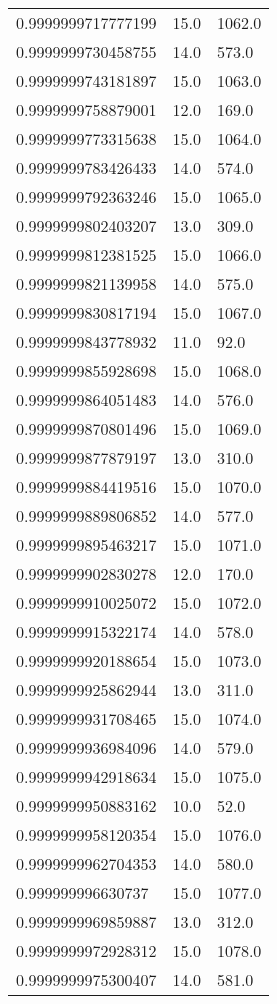 \begin{center}
\begin{supertabular}[H]{p{0.30\textwidth}p{0.05\textwidth}p{0.05\textwidth}}
0.9999999717777199 & 15.0 & 1062.0 \\ 
0.9999999730458755 & 14.0 & 573.0 \\ 
0.9999999743181897 & 15.0 & 1063.0 \\ 
0.9999999758879001 & 12.0 & 169.0 \\ 
0.9999999773315638 & 15.0 & 1064.0 \\ 
0.9999999783426433 & 14.0 & 574.0 \\ 
0.9999999792363246 & 15.0 & 1065.0 \\ 
0.9999999802403207 & 13.0 & 309.0 \\ 
0.9999999812381525 & 15.0 & 1066.0 \\ 
0.9999999821139958 & 14.0 & 575.0 \\ 
0.9999999830817194 & 15.0 & 1067.0 \\ 
0.9999999843778932 & 11.0 & 92.0 \\ 
0.9999999855928698 & 15.0 & 1068.0 \\ 
0.9999999864051483 & 14.0 & 576.0 \\ 
0.9999999870801496 & 15.0 & 1069.0 \\ 
0.9999999877879197 & 13.0 & 310.0 \\ 
0.9999999884419516 & 15.0 & 1070.0 \\ 
0.9999999889806852 & 14.0 & 577.0 \\ 
0.9999999895463217 & 15.0 & 1071.0 \\ 
0.9999999902830278 & 12.0 & 170.0 \\ 
0.9999999910025072 & 15.0 & 1072.0 \\ 
0.9999999915322174 & 14.0 & 578.0 \\ 
0.9999999920188654 & 15.0 & 1073.0 \\ 
0.9999999925862944 & 13.0 & 311.0 \\ 
0.9999999931708465 & 15.0 & 1074.0 \\ 
0.9999999936984096 & 14.0 & 579.0 \\ 
0.9999999942918634 & 15.0 & 1075.0 \\ 
0.9999999950883162 & 10.0 & 52.0 \\ 
0.9999999958120354 & 15.0 & 1076.0 \\ 
0.9999999962704353 & 14.0 & 580.0 \\ 
0.999999996630737 & 15.0 & 1077.0 \\ 
0.9999999969859887 & 13.0 & 312.0 \\ 
0.9999999972928312 & 15.0 & 1078.0 \\ 
0.9999999975300407 & 14.0 & 581.0 \\ 

\end{supertabular}
\end{center}
